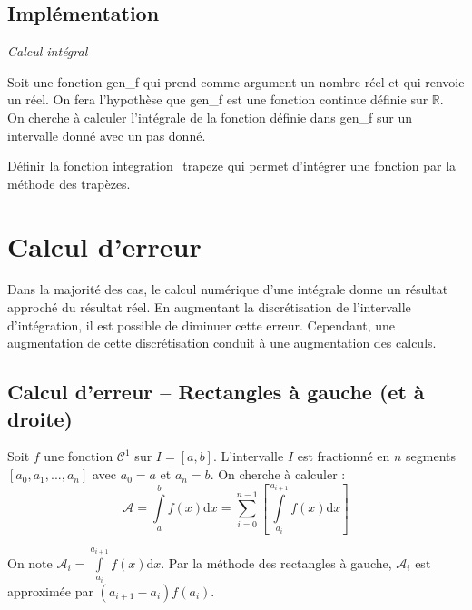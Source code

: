 \documentclass[10pt]{article}
\begin{document}
\begin{minipage}[c]{.38\linewidth}
\end{minipage}

\subsection{Implémentation}
\begin{exemple}
\textit{Calcul intégral}

Soit une fonction \textsf{gen\_f} qui prend comme argument un nombre réel et qui renvoie un réel. On fera l'hypothèse que \textsf{gen\_f} est une fonction continue définie sur $\mathbb{R}$. On cherche à calculer l'intégrale de la fonction définie dans \textsf{gen\_f} sur un intervalle donné avec un pas donné. 

Définir la fonction \textsf{integration\_trapeze} qui permet d'intégrer une fonction par la méthode des trapèzes.

\end{exemple}

\section{Calcul d'erreur}
Dans la majorité des cas, le calcul numérique d'une intégrale donne un résultat approché du résultat réel. En augmentant la discrétisation de l'intervalle d'intégration, il est possible de diminuer cette erreur. Cependant, une augmentation de cette discrétisation conduit à une augmentation des calculs. 


\subsection{Calcul d'erreur -- Rectangles à gauche (et à droite)}
Soit $f$ une fonction $\mathcal{C}^1$ sur $I=[a,b]$. L'intervalle $I$ est fractionné en $n$ segments $[a_0, a_1, ..., a_n]$ avec $a_0 = a$ et $a_n=b$. On cherche à calculer :
$$
\mathcal{A}=\int\limits_a^{b}f(x)\mathrm{d}x =  \sum\limits_{i=0}^{n-1} \left[\int\limits_{a_i}^{a_{i+1}}f(x)\mathrm{d}x \right]
$$

On note $\mathcal{A}_i = \int\limits_{a_i}^{a_{i+1}}f(x)\mathrm{d}x $. Par la méthode des rectangles à gauche, $\mathcal{A}_i$ est approximée par $\left(a_{i+1}-a_{i}\right) f(a_i) $. 
\end{document}
